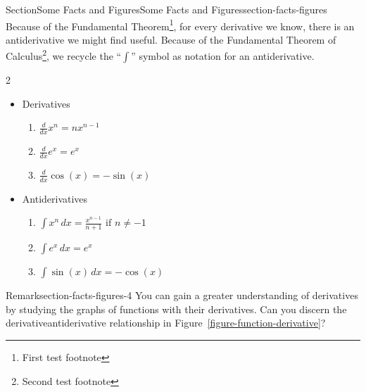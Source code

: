 \documentclass[twoside,10pt,]{article}
\newcommand{\xreffont}{\relax}
\numberwithin{equation}{section}
\newcommand{\indefiniteintegral}[2]{\int#1\,d#2}
\begin{document}
%
%
\typeout{************************************************}
\typeout{************************************************}
%
\begin{sectionptx}{Section}{Some Facts and Figures}{}{Some Facts and Figures}{}{}{section-facts-figures}
%
Because of the Fundamental Theorem\footnote{First test footnote\label{section-facts-figures-3-1}}, for every derivative we know, there is an antiderivative we might find useful.  Because of the Fundamental Theorem of Calculus\footnote{Second test footnote\label{section-facts-figures-3-2}}, we recycle the ``\(\int\)'' symbol as notation for an antiderivative.%
\begin{multicols}{2}
\begin{itemize}[label=\textbullet]
\item{}Derivatives%
\begin{enumerate}[label={(\alph*)}]
\item{}\(\displaystyle \frac{d}{dx}x^n = nx^{n-1}\)%
\item{}\(\displaystyle \frac{d}{dx}e^x = e^x\)%
\item{}\(\displaystyle \frac{d}{dx}\cos(x) = -\sin(x)\)%
\end{enumerate}
%
\item{}Antiderivatives%
\begin{enumerate}[label={\roman*)}]
\item{}\(\displaystyle \indefiniteintegral{x^n}{x} = \displaystyle\frac{x^{n-1}}{n+1}\text{ if }n\neq -1\)%
\item{}\(\displaystyle \indefiniteintegral{e^x}{x} = e^x\)%
\item{}\(\displaystyle \indefiniteintegral{\sin(x)}{x} = -\cos(x)\)%
\end{enumerate}
%
\end{itemize}
\end{multicols}
%
\begin{remark}{Remark}{}{section-facts-figures-4}%
You can\footnotemark{} gain a greater understanding of derivatives by studying the graphs of functions with their derivatives.  Can\footnotemark{} you discern the derivative\textendash{}antiderivative\footnotemark{} relationship in Figure~\hyperref[figure-function-derivative]{{\xreffont\ref{figure-function-derivative}}}?%
\end{remark}
%
%
%

\end{sectionptx}
\end{document}
